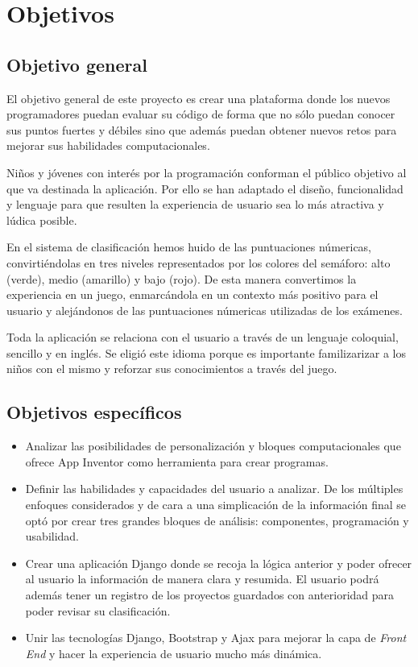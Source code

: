 \documentclass[a4paper, 12pt]{book}
\begin{document}
\cleardoublepage
\chapter{Objetivos}
\label{chap:objetivos}

\section{Objetivo general}
\label{sec:objetivo-general} El objetivo general de este proyecto es crear una plataforma donde los nuevos programadores puedan evaluar su código de forma que no sólo puedan conocer sus puntos fuertes y débiles sino que además puedan obtener nuevos retos para mejorar sus habilidades computacionales. 

Niños y jóvenes con interés por la programación conforman el público objetivo al que va destinada la aplicación. Por ello se han adaptado el diseño, funcionalidad y lenguaje para que resulten la experiencia de usuario sea lo más atractiva y lúdica posible. 

En el sistema de clasificación hemos huido de las puntuaciones númericas, convirtiéndolas en tres niveles representados por los colores del semáforo: alto (verde), medio (amarillo) y bajo (rojo). De esta manera convertimos la experiencia en un juego, enmarcándola en un contexto más positivo para el usuario y alejándonos de las puntuaciones númericas utilizadas de los exámenes. 

Toda la aplicación se relaciona con el usuario a través de un lenguaje coloquial, sencillo y en inglés. Se eligió este idioma porque es importante familizarizar a los niños con el mismo y reforzar sus conocimientos a través del juego.

\section{Objetivos específicos}
\label{sec:objetivos-especificos}
\begin{itemize}
  \item Analizar las posibilidades de personalización y bloques computacionales que ofrece App Inventor como herramienta para crear programas.

  \item Definir las habilidades y capacidades del usuario a analizar. De los múltiples enfoques considerados y de cara a una simplicación de la información final se optó por crear tres grandes bloques de análisis: componentes, programación y usabilidad.

  \item Crear una aplicación Django donde se recoja la lógica anterior y poder ofrecer al usuario la información de manera clara y resumida. El usuario podrá además tener un registro de los proyectos guardados con anterioridad para poder revisar su clasificación. 
  
  \item Unir las tecnologías Django, Bootstrap y Ajax para mejorar la capa de \textit{Front End} y hacer la experiencia de usuario mucho más dinámica.   
\end{itemize}
\end{document}
